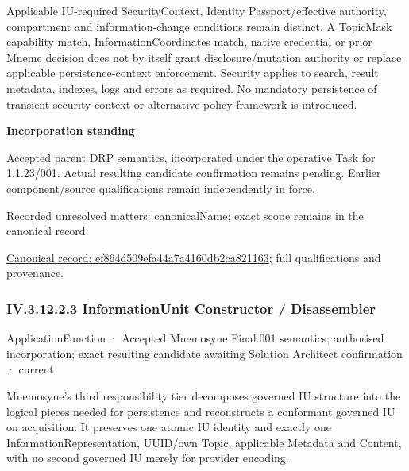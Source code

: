 Applicable IU-required SecurityContext, Identity Passport/effective authority, compartment and information-change conditions remain distinct. A TopicMask capability match, InformationCoordinates match, native credential or prior Mneme decision does not by itself grant disclosure/mutation authority or replace applicable persistence-context enforcement. Security applies to search, result metadata, indexes, logs and errors as required. No mandatory persistence of transient security context or alternative policy framework is introduced.



\par\medskip\textbf{Incorporation standing}\par


Accepted parent DRP semantics, incorporated under the operative Task for 1.1.23/001. Actual resulting candidate confirmation remains pending. Earlier component/source qualifications remain independently in force.


{\small Recorded unresolved matters: canonicalName; exact scope remains in the canonical record.}\par
{\footnotesize \href{../../../../continuum/application/application-function/ef864d509efa44a7a4160db2ca821163.md}{Canonical record: ef864d509efa44a7a4160db2ca821163}; full qualifications and provenance.}\par
\subsubsection*{IV.3.12.2.3 InformationUnit Constructor / Disassembler}
\label{navigation:IV.3.12.2.3}

\label{element:75349ac7a0d44dec955b77bb5ecf1151}
{\small ApplicationFunction · Accepted Mnemosyne Final.001 semantics; authorised incorporation; exact resulting candidate awaiting Solution Architect confirmation · current}\par

Mnemosyne's third responsibility tier decomposes governed IU structure into the logical pieces needed for persistence and reconstructs a conformant governed IU on acquisition. It preserves one atomic IU identity and exactly one InformationRepresentation, UUID/own Topic, applicable Metadata and Content, with no second governed IU merely for provider encoding.



